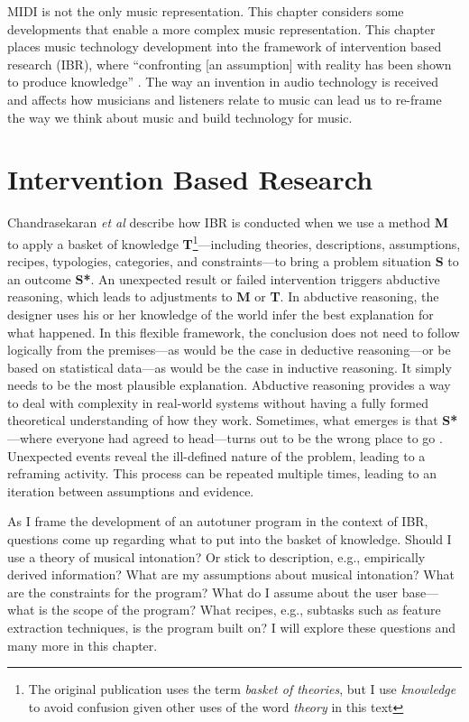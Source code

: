 MIDI is not the only music representation. This chapter considers some developments that enable a more complex music representation. This chapter places music technology development into the framework of intervention based research (IBR), where ``confronting [an assumption] with reality has been shown to produce knowledge'' \cite{chandrasekaran2020ibr}. The way an invention in audio technology is received and affects how musicians and listeners relate to music can lead us to re-frame the way we think about music and build technology for music.

\section{Intervention Based Research}
Chandrasekaran \textit{et al} \cite{chandrasekaran2020ibr} describe how IBR is conducted when we use a method \textbf{M} to apply a basket of knowledge \textbf{T}\footnote{The original publication uses the term \textit{basket of theories}, but I use \textit{knowledge} to avoid confusion given other uses of the word \textit{theory} in this text}---including theories, descriptions, assumptions, recipes, typologies, categories, and constraints---to bring a problem situation \textbf{S} to an outcome \textbf{S*}. An unexpected result or failed intervention triggers abductive reasoning, which leads to adjustments to \textbf{M} or \textbf{T}. In abductive reasoning, the designer uses his or her knowledge of the world infer the best explanation for what happened. In this flexible framework, the conclusion does not need to follow logically from the premises---as would be the case in deductive reasoning---or be based on statistical data---as would be the case in inductive reasoning. It simply needs to be the most plausible explanation\cite{sep-abduction}. Abductive reasoning provides a way to deal with complexity in real-world systems without having a fully formed theoretical understanding of how they work. Sometimes, what emerges is that \textbf{S*}---where everyone had agreed to head---turns out to be the wrong place to go \cite{chandrasekaran2020ibr}. Unexpected events reveal the ill-defined nature of the problem, leading to a reframing activity. This process can be repeated multiple times, leading to an iteration between assumptions and evidence.

As I frame the development of an autotuner program in the context of IBR, questions come up regarding what to put into the basket of knowledge. Should I use a theory of musical intonation? Or stick to description, e.g., empirically derived information? What are my assumptions about musical intonation? What are the constraints for the program? What do I assume about the user base---what is the scope of the program? What recipes, e.g., subtasks such as feature extraction techniques, is the program built on? I will explore these questions and many more in this chapter. 


